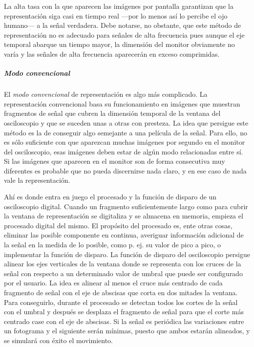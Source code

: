 La alta tasa con la que aparecen las imágenes por pantalla garantizan que
la representación siga casi en tiempo real ---por lo menos así lo percibe
el ojo humano--- a la señal verdadera. Debe notarse, no obstante, que este
método de representación no es adecuado para señales de alta frecuencia
pues aunque el eje temporal abarque un tiempo mayor, la dimensión del
monitor obviamente no varía y las señales de alta frecuencia aparecerán en
exceso comprimidas.


\subparagraph{Modo convencional}

El \emph{modo convencional} de representación es algo más complicado. La
representación convencional basa su funcionamiento en imágenes que muestran
fragmentos de señal que cubren la dimensión temporal de la ventana del
osciloscopio y que se suceden unas a otras con presteza. La idea que
persigue este método es la de conseguir algo semejante a una película de la
señal. Para ello, no es sólo suficiente con que aparezcan muchas imágenes
por segundo en el monitor del osciloscopio, esas imágenes deben estar de
algún modo relacionadas entre sí. Si las imágenes que aparecen en el
monitor son de forma consecutiva muy diferentes es probable que no pueda
discernirse nada claro, y en ese caso de nada vale la representación.

Ahí es donde entra en juego el procesado y la función de disparo de un
osciloscopio digital. Cuando un fragmento suficientemente largo como para
cubrir la ventana de representación se digitaliza y se almacena en memoria,
empieza el procesado digital del mismo. El propósito del procesado es, ente
otras cosas, eliminar las posible componente en continua, averiguar
información adicional de la señal en la medida de lo posible, como p. ej.
su valor de pico a pico, o implementar la función de disparo. La función de
disparo del osciloscopio persigue alinear los ejes verticales de la ventana
donde se representa con los cruces de la señal con respecto a un
determinado valor de umbral que puede ser configurado por el usuario. La
idea es alinear al menos el cruce más centrado de cada fragmento de señal
con el eje de abscisas que corta en dos mitades la ventana. Para
conseguirlo, durante el procesado se detectan todos los cortes de la señal
con el umbral y después se desplaza el fragmento de señal para que el corte
más centrado case con el eje de abscisas. Si la señal es periódica las
variaciones entre un fotograma y el siguiente serán mínimas, puesto que
ambos estarán alineados, y se simulará con éxito el movimiento.

